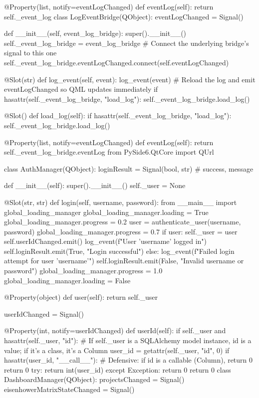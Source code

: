 \documentclass{report}
\begin{document}
\begin{python}
    @Property(list, notify=eventLogChanged)
    def eventLog(self):
        return self._event_log
class LogEventBridge(QObject):
    eventLogChanged = Signal()

    def __init__(self, event_log_bridge):
        super().__init__()
        self._event_log_bridge = event_log_bridge
        # Connect the underlying bridge's signal to this one
        self._event_log_bridge.eventLogChanged.connect(self.eventLogChanged)

    @Slot(str)
    def log_event(self, event):
        log_event(event)
        # Reload the log and emit eventLogChanged so QML updates immediately
        if hasattr(self._event_log_bridge, "load_log"):
            self._event_log_bridge.load_log()

    @Slot()
    def load_log(self):
        if hasattr(self._event_log_bridge, "load_log"):
            self._event_log_bridge.load_log()

    @Property(list, notify=eventLogChanged)
    def eventLog(self):
        return self._event_log_bridge.eventLog
from PySide6.QtCore import QUrl
 
class AuthManager(QObject):
    loginResult = Signal(bool, str)  # success, message

    def __init__(self):
        super().__init__()
        self._user = None

    @Slot(str, str)
    def login(self, username, password):
        from __main__ import global_loading_manager
        global_loading_manager.loading = True
        global_loading_manager.progress = 0.2
        user = authenticate_user(username, password)
        global_loading_manager.progress = 0.7
        if user:
            self._user = user
            self.userIdChanged.emit()
            log_event(f"User '{username}' logged in")
            self.loginResult.emit(True, "Login successful")
        else:
            log_event(f"Failed login attempt for user '{username}'")
            self.loginResult.emit(False, "Invalid username or password")
        global_loading_manager.progress = 1.0
        global_loading_manager.loading = False

    @Property(object)
    def user(self):
        return self._user

    userIdChanged = Signal()

    @Property(int, notify=userIdChanged)
    def userId(self):
        if self._user and hasattr(self._user, "id"):
            # If self._user is a SQLAlchemy model instance, id is a value; if it's a class, it's a Column
            user_id = getattr(self._user, "id", 0)
            if hasattr(user_id, "__call__"):
                # Defensive: if id is a callable (Column), return 0
                return 0
            try:
                return int(user_id)
            except Exception:
                return 0
        return 0
class DashboardManager(QObject):
    projectsChanged = Signal()
    eisenhowerMatrixStateChanged = Signal()


\end{python}
\end{document}
